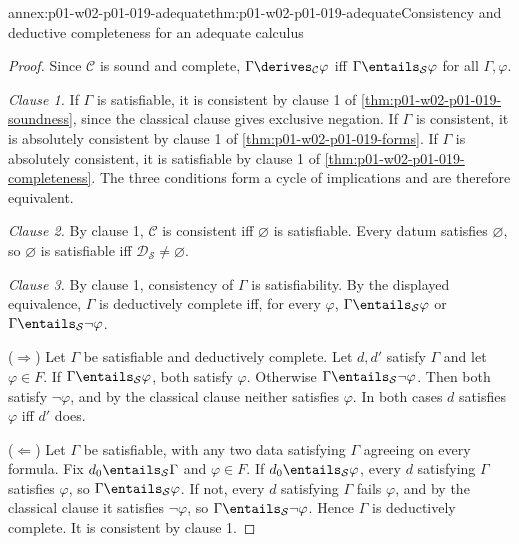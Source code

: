 \begin{annexitem}{annex:p01-w02-p01-019-adequate}{thm:p01-w02-p01-019-adequate}{Consistency and deductive completeness for an adequate calculus}
\begin{proof}
Since \(\mathcal C\) is sound and complete, \(\Gamma\derives_{\mathcal C}\varphi\)
iff \(\Gamma\entails_{\mathcal S}\varphi\) for all \(\Gamma,\varphi\).

\emph{Clause 1.} If \(\Gamma\) is satisfiable, it is consistent by clause 1 of
\cref{thm:p01-w02-p01-019-soundness}, since the classical clause gives
exclusive negation. If \(\Gamma\) is consistent, it is absolutely consistent
by clause 1 of \cref{thm:p01-w02-p01-019-forms}. If \(\Gamma\) is absolutely
consistent, it is satisfiable by clause 1 of
\cref{thm:p01-w02-p01-019-completeness}. The three conditions form a cycle of
implications and are therefore equivalent.

\emph{Clause 2.} By clause 1, \(\mathcal C\) is consistent iff
\(\varnothing\) is satisfiable. Every datum satisfies \(\varnothing\), so
\(\varnothing\) is satisfiable iff
\(\mathcal D_{\mathcal S}\neq\varnothing\).

\emph{Clause 3.} By clause 1, consistency of \(\Gamma\) is satisfiability. By
the displayed equivalence, \(\Gamma\) is deductively complete iff, for every
\(\varphi\), \(\Gamma\entails_{\mathcal S}\varphi\) or
\(\Gamma\entails_{\mathcal S}\neg\varphi\).

(\(\Rightarrow\)) Let \(\Gamma\) be satisfiable and deductively complete. Let
\(d,d'\) satisfy \(\Gamma\) and let \(\varphi\in F\). If
\(\Gamma\entails_{\mathcal S}\varphi\), both satisfy \(\varphi\). Otherwise
\(\Gamma\entails_{\mathcal S}\neg\varphi\). Then both satisfy
\(\neg\varphi\), and by the classical clause neither satisfies \(\varphi\).
In both cases \(d\) satisfies \(\varphi\) iff \(d'\) does.

(\(\Leftarrow\)) Let \(\Gamma\) be satisfiable, with any two data satisfying
\(\Gamma\) agreeing on every formula. Fix \(d_0\entails_{\mathcal S}\Gamma\)
and \(\varphi\in F\). If \(d_0\entails_{\mathcal S}\varphi\), every \(d\)
satisfying \(\Gamma\) satisfies \(\varphi\), so
\(\Gamma\entails_{\mathcal S}\varphi\). If not, every \(d\) satisfying
\(\Gamma\) fails \(\varphi\), and by the classical clause it satisfies
\(\neg\varphi\), so \(\Gamma\entails_{\mathcal S}\neg\varphi\). Hence
\(\Gamma\) is deductively complete. It is consistent by clause 1.


\end{proof}
\end{annexitem}
